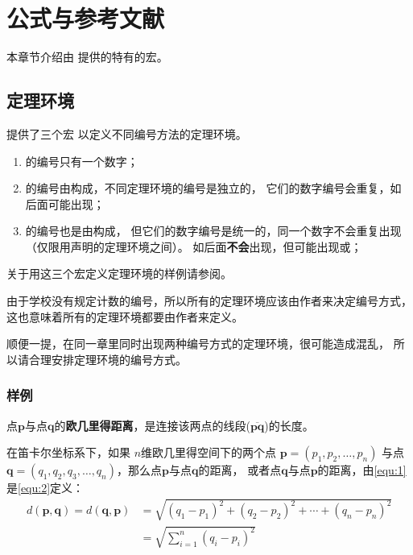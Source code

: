 \chapter{公式与参考文献}

本章节介绍由 \nwafuthesis{} 提供的特有的宏。

\section{定理环境}

\nwafuthesis{} 提供了三个宏  以定义不同编号方法的定理环境。
\begin{enumerate}
  \item {} 的编号只有一个数字；
  \item {} 的编号由构成，不同定理环境的编号是独立的，
  它们的数字编号会重复，如后面可能出现；
  \item {} 的编号也是由构成，
  但它们的数字编号是统一的，同一个数字不会重复出现（仅限用声明的定理环境之间）。
  如后面\textbf{不会}出现，但可能出现或；
\end{enumerate}

关于用这三个宏定义定理环境的样例请参阅。

由于学校没有规定计数的编号，所以所有的定理环境应该由作者来决定编号方式，
这也意味着所有的定理环境都要由作者来定义。

顺便一提，在同一章里同时出现两种编号方式的定理环境，很可能造成混乱，
所以请合理安排定理环境的编号方式。

\subsection*{样例}

\begin{definition}[欧几里得距离]
\label{def:distance}
点$\mathbf{p}$与点$\mathbf{q}$的\textbf{欧几里得距离}，是连接该两点的线段($\overline{\mathbf{pq}}$)的长度。

在笛卡尔坐标系下，如果 $n$维欧几里得空间下的两个点 $\mathbf{p}=(p_1, p_2, \dots, p_n)$ 与点
$\mathbf{q} = (q_1, q_2, q_3, \dots, q_n)$，那么点$\mathbf{p}$与点$\mathbf{q}$的距离，
或者点$\mathbf{q}$与点$\mathbf{p}$的距离，由\autoref{equ:1}是\autoref{equ:2}定义：
\begin{align}
\label{equ:1}
d(\mathbf{p},\mathbf{q}) = d(\mathbf{q},\mathbf{p}) & = \sqrt{(q_1-p_1)^2 + (q_2-p_2)^2 + \cdots + (q_n-p_n)^2} \\
\label{equ:2}
& = \sqrt{\sum_{i=1}^n (q_i-p_i)^2}
\end{align}
\end{definition}

